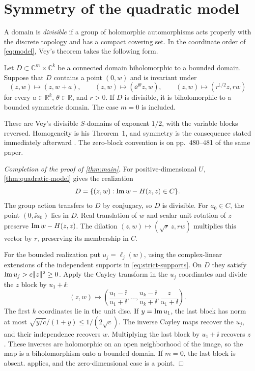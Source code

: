 \section{Symmetry of the quadratic model}\label{sec:symmetry}

A domain is \emph{divisible} if a group of holomorphic automorphisms acts properly with the discrete topology and has a compact covering set. In the coordinate order of \eqref{eq:model}, Vey's theorem takes the following form.

\begin{theorem}\label{thm:model-symmetry}
Let $D\subset\mathbb{C}^m\times\mathbb{C}^k$ be a connected domain biholomorphic to a bounded domain.  Suppose that $D$ contains a point $(0,w)$ and is invariant under
\[
 (z,w)\longmapsto(z,w+a),\qquad
 (z,w)\longmapsto(\ee^{\ii\theta}z,w),\qquad
 (z,w)\longmapsto(r^{1/2}z,rw)
\]
for every $a\in\mathbb{R}^k$, $\theta\in\mathbb{R}$, and $r>0$. If $D$ is divisible, it is biholomorphic to a bounded symmetric domain. The case $m=0$ is included.
\end{theorem}

These are Vey's divisible $S$-domains of exponent $1/2$, with the variable blocks reversed. Homogeneity is his Theorem~1, and symmetry is the consequence stated immediately afterward \cite[p.~479]{Vey1970}. The zero-block convention is on pp.~480--481 of the same paper.

\begin{proof}[Completion of the proof of \cref{thm:main}]
For positive-dimensional $U$, \cref{thm:quadratic-model} gives the realization
\[
 D=\{(z,w):\operatorname{Im} w-H(z,z)\in C\}.
\]
The group action transfers to $D$ by conjugacy, so $D$ is divisible. For $a_0\in C$, the point $(0,\ii a_0)$ lies in $D$. Real translation of $w$ and scalar unit rotation of $z$ preserve $\operatorname{Im} w-H(z,z)$. The dilation $(z,w)\mapsto(\sqrt r\,z,rw)$ multiplies this vector by $r$, preserving its membership in $C$.

For the bounded realization put $u_j=\ell_j(w)$, using the complex-linear extensions of the independent supports in \eqref{eq:strict-supports}. On $D$ they satisfy $\operatorname{Im} u_j>c\|z\|^2\ge0$. Apply the Cayley transform in the $u_j$ coordinates and divide the $z$ block by $u_1+\ii$:
\[
 (z,w)\longmapsto
 \left(\frac{u_1-\ii}{u_1+\ii},\ldots,\frac{u_k-\ii}{u_k+\ii},
              \frac{z}{u_1+\ii}\right).
\]
The first $k$ coordinates lie in the unit disc. If $y=\operatorname{Im} u_1$, the last block has norm at most $\sqrt{y/c}/(1+y)\le1/(2\sqrt c)$. The inverse Cayley maps recover the $u_j$, and their independence recovers $w$. Multiplying the last block by $u_1+\ii$ recovers $z$. These inverses are holomorphic on an open neighborhood of the image, so the map is a biholomorphism onto a bounded domain. If $m=0$, the last block is absent.  applies, and the zero-dimensional case is a point.
\end{proof}

